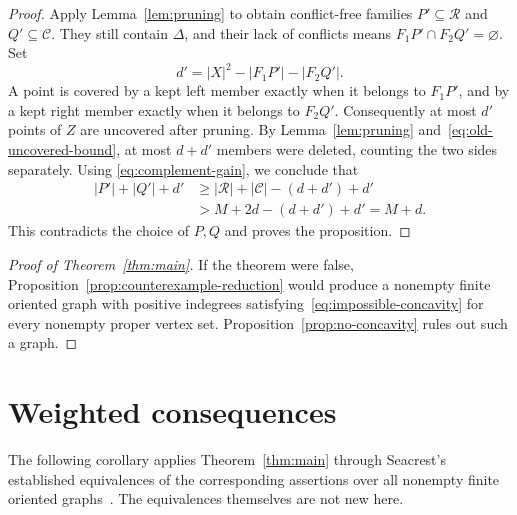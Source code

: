 \documentclass[11pt]{article}
\theoremstyle{remark}
\newcommand{\abs}[1]{\lvert #1\rvert}
\begin{document}
\begin{proof}
Apply Lemma~\ref{lem:pruning} to obtain conflict-free families
$P'\subseteq\mathcal R$ and $Q'\subseteq\mathcal C$.
They still contain $\Delta$, and their lack of conflicts means
$F_1P'\cap F_2Q'=\varnothing$.  Set
\[
 d'=\abs{X}^2-\abs{F_1P'}-\abs{F_2Q'}.
\]
A point is covered by a kept left member exactly when it belongs to
$F_1P'$, and by a kept right member exactly when it belongs to $F_2Q'$.
Consequently at most $d'$ points of $Z$ are uncovered after pruning.
By Lemma~\ref{lem:pruning} and~\eqref{eq:old-uncovered-bound}, at most $d+d'$ members
were deleted, counting the two sides separately.  Using
\eqref{eq:complement-gain}, we conclude that
\[
 \begin{aligned}
 \abs{P'}+\abs{Q'}+d'
 &\ge \abs{\mathcal R}+\abs{\mathcal C}-(d+d')+d'\\
 &>M+2d-(d+d')+d'=M+d.
 \end{aligned}
\]
This contradicts the choice of $P,Q$ and proves the proposition.
\end{proof}

\begin{proof}[Proof of Theorem~\ref{thm:main}]
If the theorem were false, Proposition~\ref{prop:counterexample-reduction}
would produce a nonempty finite oriented graph with positive indegrees
satisfying~\eqref{eq:impossible-concavity} for every nonempty proper vertex
set.  Proposition~\ref{prop:no-concavity} rules out such a graph.
\end{proof}

\section{Weighted consequences}\label{sec:weighted-consequences}

The following corollary applies Theorem~\ref{thm:main} through Seacrest's
established equivalences of the corresponding assertions over all nonempty
finite oriented graphs~\cite{Seacrest2015}.  The equivalences themselves are
not new here.
\end{document}
